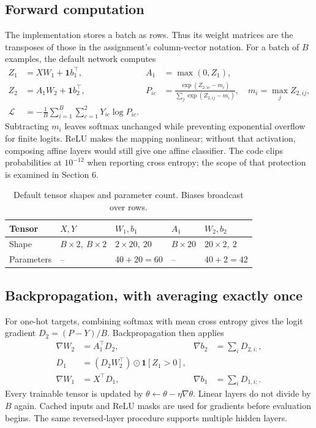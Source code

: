 \documentclass[10pt,a4paper]{article}
\begin{document}
\subsection{Forward computation}
The implementation stores a batch as rows. Thus its weight matrices are the
transposes of those in the assignment's column-vector notation. For a batch
of $B$ examples, the default network computes
\begin{align*}
Z_1&=XW_1+\mathbf1 b_1^\top,& A_1&=\max(0,Z_1),\\
Z_2&=A_1W_2+\mathbf1 b_2^\top,&
P_{ic}&=\frac{\exp(Z_{2,ic}-m_i)}{\sum_j\exp(Z_{2,ij}-m_i)},\quad m_i=\max_j Z_{2,ij},\\
\mathcal L&=-\frac1B\sum_{i=1}^{B}\sum_{c=1}^{2}Y_{ic}\log P_{ic}.&&
\end{align*}
Subtracting $m_i$ leaves softmax unchanged while preventing exponential
overflow for finite logits. ReLU makes the mapping nonlinear; without that
activation, composing affine layers would still give one affine classifier.
The code clips probabilities at $10^{-12}$ when reporting cross entropy;
the scope of that protection is examined in Section 6.
\begin{table}[H]\small\centering
\caption{Default tensor shapes and parameter count. Biases broadcast over rows.}
\begin{tabular}{@{}lllll@{}}\toprule
Tensor & $X,Y$ & $W_1,b_1$ & $A_1$ & $W_2,b_2$\\\midrule
Shape & $B\times2,\ B\times2$ & $2\times20,\ 20$ & $B\times20$ & $20\times2,\ 2$\\
Parameters & -- & $40+20=60$ & -- & $40+2=42$\\\bottomrule
\end{tabular}\end{table}

\subsection{Backpropagation, with averaging exactly once}
For one-hot targets, combining softmax with mean cross entropy gives the
logit gradient $D_2=(P-Y)/B$. Backpropagation then applies
\begin{align*}
\nabla W_2&=A_1^\top D_2,& \nabla b_2&=\sum_i D_{2,i:},\\
D_1&=(D_2W_2^\top)\odot\mathbf1[Z_1>0],&&\\
\nabla W_1&=X^\top D_1,& \nabla b_1&=\sum_i D_{1,i:}.
\end{align*}
Every trainable tensor is updated by $\theta\leftarrow\theta-\eta\nabla\theta$.
Linear layers do not divide by $B$ again. Cached inputs and ReLU masks are
used for gradients before evaluation begins. The same reversed-layer
procedure supports multiple hidden layers.
\end{document}
